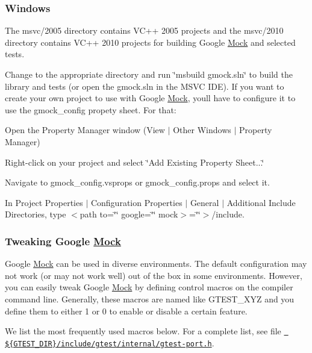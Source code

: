 \subsubsection*{Windows}

The msvc/2005 directory contains V\+C++ 2005 projects and the msvc/2010 directory contains V\+C++ 2010 projects for building Google \mbox{\hyperlink{class_mock}{Mock}} and selected tests.

Change to the appropriate directory and run \char`\"{}msbuild gmock.\+sln\char`\"{} to build the library and tests (or open the gmock.\+sln in the M\+S\+VC I\+DE). If you want to create your own project to use with Google \mbox{\hyperlink{class_mock}{Mock}}, you\textquotesingle{}ll have to configure it to use the {\ttfamily gmock\+\_\+config} propety sheet. For that\+:


\begin{DoxyItemize}
\item Open the Property Manager window (View $\vert$ Other Windows $\vert$ Property Manager)
\item Right-\/click on your project and select \char`\"{}\+Add Existing Property Sheet...\char`\"{}
\item Navigate to {\ttfamily gmock\+\_\+config.\+vsprops} or {\ttfamily gmock\+\_\+config.\+props} and select it.
\item In Project Properties $\vert$ Configuration Properties $\vert$ General $\vert$ Additional Include Directories, type $<$path to=\char`\"{}\char`\"{} google=\char`\"{}\char`\"{} mock$>$=\char`\"{}\char`\"{}$>$/include.
\end{DoxyItemize}

\subsubsection*{Tweaking Google \mbox{\hyperlink{class_mock}{Mock}}}

Google \mbox{\hyperlink{class_mock}{Mock}} can be used in diverse environments. The default configuration may not work (or may not work well) out of the box in some environments. However, you can easily tweak Google \mbox{\hyperlink{class_mock}{Mock}} by defining control macros on the compiler command line. Generally, these macros are named like {\ttfamily G\+T\+E\+S\+T\+\_\+\+X\+YZ} and you define them to either 1 or 0 to enable or disable a certain feature.

We list the most frequently used macros below. For a complete list, see file \href{../googletest/include/gtest/internal/gtest-port.h}{\texttt{ \$\{G\+T\+E\+S\+T\+\_\+\+D\+IR\}/include/gtest/internal/gtest-\/port.h}}.

